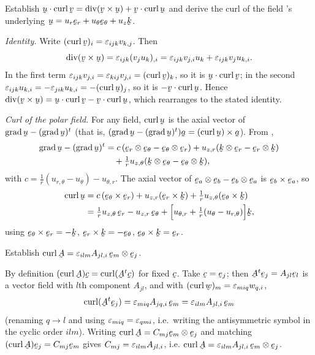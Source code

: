 \begin{problem}
Establish $\ip\bu{\crl\bv}=\dvg(\bv\times\bu)+\ip\bv{\crl\bu}$ and derive
the curl of the field 's underlying
$\bu=u_r\ber+u_\theta\beth+u_z\bk$.
\end{problem}
\begin{solution}
\emph{Identity.} Write $(\crl\bv)_i=\eps_{ijk}v_{k,j}$. Then
\[
\dvg(\bv\times\bu)=\eps_{ijk}(v_ju_k)_{,i}
=\eps_{ijk}v_{j,i}u_k+\eps_{ijk}v_ju_{k,i}.
\]
In the first term $\eps_{ijk}v_{j,i}=\eps_{kij}v_{j,i}=(\crl\bv)_k$, so it
is $\ip\bu{\crl\bv}$; in the second $\eps_{ijk}u_{k,i}
=-\eps_{jik}u_{k,i}=-(\crl\bu)_j$, so it is $-\ip\bv{\crl\bu}$. Hence
$\dvg(\bv\times\bu)=\ip\bu{\crl\bv}-\ip\bv{\crl\bu}$, which rearranges to
the stated identity.

\emph{Curl of the polar field.} For any field, $\crl\bu$ is the axial
vector of $\grad\bu-(\grad\bu)^t$ (that is,
$(\grad\bu-(\grad\bu)^t)\ba=(\crl\bu)\times\ba$). From ,
\[
\begin{aligned}
\grad\bu-(\grad\bu)^t
&=c\,(\ber\otimes\beth-\beth\otimes\ber)
+u_{z,r}(\bk\otimes\ber-\ber\otimes\bk)\\
&\quad+\tfrac1r u_{z,\theta}(\bk\otimes\beth-\beth\otimes\bk),
\end{aligned}
\]
with $c=\tfrac1r(u_{r,\theta}-u_\theta)-u_{\theta,r}$. The axial vector of
$\be_a\otimes\be_b-\be_b\otimes\be_a$ is $\be_b\times\be_a$, so
\[
\begin{aligned}
\crl\bu&=c\,(\beth\times\ber)+u_{z,r}(\ber\times\bk)
+\tfrac1r u_{z,\theta}(\beth\times\bk)\\
&=\tfrac1r u_{z,\theta}\,\ber-u_{z,r}\,\beth
+\Big[u_{\theta,r}+\tfrac1r(u_\theta-u_{r,\theta})\Big]\bk,
\end{aligned}
\]
using $\beth\times\ber=-\bk$, $\ber\times\bk=-\beth$,
$\beth\times\bk=\ber$.
\end{solution}

\begin{problem}
Establish $\crl\bA=\eps_{ilm}A_{jl,i}\,\be_m\otimes\be_j$.
\end{problem}
\begin{solution}
By definition $(\crl\bA)\bc=\crl(\bA^{t}\bc)$ for fixed $\bc$. Take
$\bc=\be_j$; then $\bA^{t}\be_j=A_{jl}\be_l$ is a vector field with $l$th
component $A_{jl}$, and with $(\crl\bw)_m=\eps_{miq}w_{q,i}$,
\[
\crl(\bA^{t}\be_j)=\eps_{miq}A_{jq,i}\,\be_m
=\eps_{ilm}A_{jl,i}\,\be_m
\]
(renaming $q\to l$ and using $\varepsilon_{miq}=\varepsilon_{qmi}$, i.e.\ writing the
antisymmetric symbol in the cyclic order $ilm$). Writing
$\crl\bA=C_{mj}\be_m\otimes\be_j$ and matching
$(\crl\bA)\be_j=C_{mj}\be_m$ gives $C_{mj}=\varepsilon_{ilm}A_{jl,i}$, i.e.
$\crl\bA=\eps_{ilm}A_{jl,i}\,\be_m\otimes\be_j$.
\end{solution}

